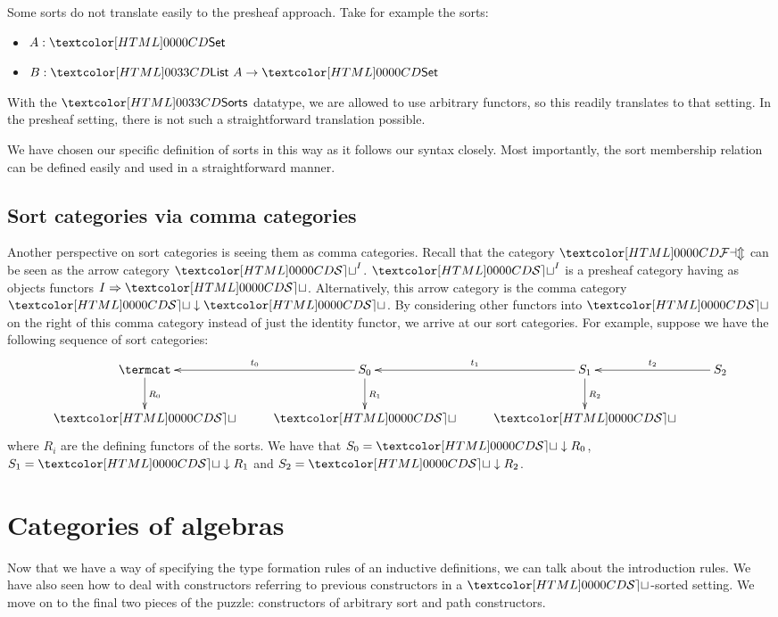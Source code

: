 Some sorts do not translate easily to the presheaf approach. Take for
example the sorts:
\begin{itemize}
\item $A : \Set$
\item $B : \List\ A \to \Set$
\end{itemize}
With the $\sortsty$ datatype, we are allowed to use arbitrary
functors, so this readily translates to that setting. In the presheaf
setting, there is not such a straightforward translation possible.

We have chosen our specific definition of sorts in this way as it
follows our syntax closely. Most importantly, the sort membership
relation can be defined easily and used in a straightforward manner.

\subsection{Sort categories via comma categories}

Another perspective on sort categories is seeing them as comma
categories. Recall that the category $\FAM$ can be seen as the arrow
category $\SET^I$. $\SET^I$ is a presheaf category having as objects
functors $\Func{I}{\SET}$. Alternatively, this arrow category is the
comma category $\SET \downarrow \SET$. By considering other functors
into $\SET$ on the right of this comma category instead of just the
identity functor, we arrive at our sort categories. For example,
suppose we have the following sequence of sort categories:
$$
\xymatrix{
\termcat
\ar[d]^{R_0}
&S_0
\ar[d]^{R_1}
\ar[l]_{t_0}
&S_1
\ar[d]^{R_2}
\ar[l]_{t_1}
&S_2
\ar[l]_{t_2} \\
\SET
&\SET
&\SET
}
$$
where $R_i$ are the defining functors of the sorts. We have that
$S_0 = \SET \downarrow R_0$, $S_1 = \SET \downarrow R_1$ and
$S_2 = \SET \downarrow R_2$.

\section{Categories of algebras}
\label{categories-of-algebras}

Now that we have a way of specifying the type formation rules of an
inductive definitions, we can talk about the introduction rules. We
have also seen how to deal with constructors referring to previous
constructors in a $\SET$-sorted setting. We move on to the final two
pieces of the puzzle: constructors of arbitrary sort and path
constructors.

